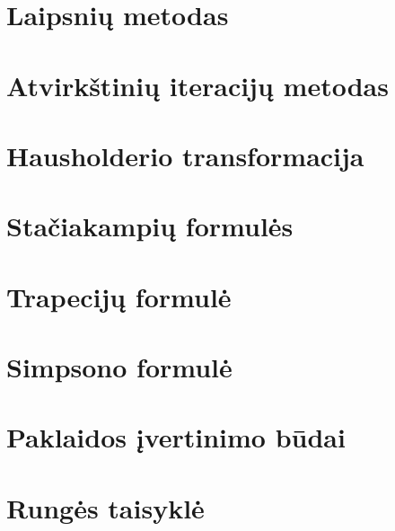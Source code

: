 \section{Laipsnių metodas}
\cite[151-154]{textbook}
\section{Atvirkštinių iteracijų metodas}
\cite[141-142,146-148]{textbook}
\section{Hausholderio transformacija}
\cite[148-151]{textbook}

\section{Stačiakampių formulės}
\cite[181-184]{textbook}
\section{Trapecijų formulė}
\cite[184-186]{textbook}
\section{Simpsono formulė}
\cite[187-188]{textbook}
\section{Paklaidos įvertinimo būdai}
\cite[189-191]{textbook}
\section{Rungės taisyklė}
\cite[190-192]{textbook}
